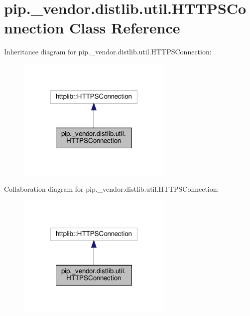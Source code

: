 \hypertarget{classpip_1_1__vendor_1_1distlib_1_1util_1_1HTTPSConnection}{}\section{pip.\+\_\+vendor.\+distlib.\+util.\+H\+T\+T\+P\+S\+Connection Class Reference}
\label{classpip_1_1__vendor_1_1distlib_1_1util_1_1HTTPSConnection}


Inheritance diagram for pip.\+\_\+vendor.\+distlib.\+util.\+H\+T\+T\+P\+S\+Connection\+:
\nopagebreak
\begin{figure}[H]
\begin{center}
\leavevmode
\includegraphics[width=211pt]{classpip_1_1__vendor_1_1distlib_1_1util_1_1HTTPSConnection__inherit__graph}
\end{center}
\end{figure}


Collaboration diagram for pip.\+\_\+vendor.\+distlib.\+util.\+H\+T\+T\+P\+S\+Connection\+:
\nopagebreak
\begin{figure}[H]
\begin{center}
\leavevmode
\includegraphics[width=211pt]{classpip_1_1__vendor_1_1distlib_1_1util_1_1HTTPSConnection__coll__graph}
\end{center}
\end{figure}
